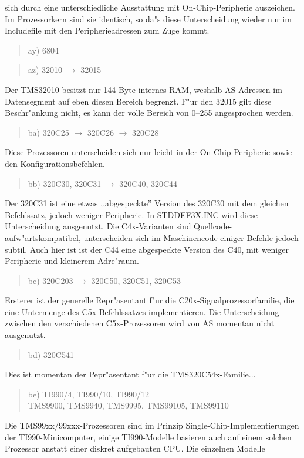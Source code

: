 \documentclass[12pt,a4paper,twoside]{report}
\begin{document}
sich durch eine unterschiedliche Ausstattung mit On-Chip-Peripherie
auszeichen.  Im Prozessorkern sind sie identisch, so da"s diese
Unterscheidung wieder nur im Includefile mit den Peripherieadressen zum
Zuge kommt.
\begin{quote}
ay) 6804
\end{quote}
\begin{quote}
az) 32010 $\rightarrow$ 32015
\end{quote}
Der TMS32010 besitzt nur 144 Byte internes RAM, weshalb AS Adressen im
Datensegment auf eben diesen Bereich begrenzt.  F"ur den 32015 gilt diese
Beschr"ankung nicht, es kann der volle Bereich von 0--255 angesprochen
werden.
\begin{quote}
ba) 320C25 $\rightarrow$ 320C26 $\rightarrow$ 320C28
\end{quote}
Diese Prozessoren unterscheiden sich nur leicht in der
On-Chip-Peripherie sowie den Konfigurationsbefehlen.
\begin{quote}
bb) 320C30, 320C31 $\rightarrow$ 320C40, 320C44
\end{quote}
Der 320C31 ist eine etwas ,,abgespeckte'' Version des 320C30 mit dem
gleichen Befehlssatz, jedoch weniger Peripherie.  In STDDEF3X.INC
wird diese Unterscheidung ausgenutzt.  Die C4x-Varianten sind
Quellcode-aufw"artskompatibel, unterscheiden sich im
Maschinencode einiger Befehle jedoch subtil.  Auch hier ist ist
der C44 eine abgespeckte Version des C40, mit weniger Peripherie
und kleinerem Adre"raum.
\begin{quote}
bc) 320C203 $\rightarrow$ 320C50, 320C51, 320C53
\end{quote}
Ersterer ist der generelle Repr"asentant f"ur die
C20x-Signalprozessorfamilie, die eine Untermenge des C5x-Befehlssatzes
implementieren.  Die Unterscheidung zwischen den verschiedenen
C5x-Prozessoren wird von AS momentan nicht ausgenutzt.
\begin{quote}
bd) 320C541
\end{quote}
Dies ist momentan der Pepr"asentant f"ur die TMS320C54x-Familie...
\begin{quote}
be) TI990/4, TI990/10, TI990/12 \\
    TMS9900, TMS9940, TMS9995, TMS99105, TMS99110
\end{quote}
Die TMS99xx/99xxx-Prozessoren sind im Prinzip Single-Chip-Implementierungen
der TI990-Minicomputer, einige TI990-Modelle basieren auch auf einem solchen
Prozessor anstatt einer diskret aufgebauten CPU.  Die einzelnen Modelle
\end{document}
